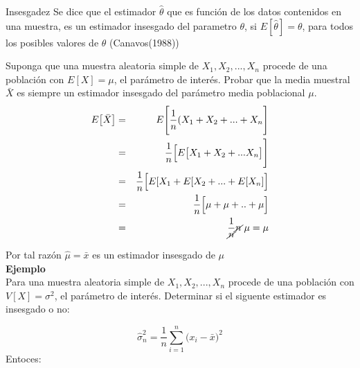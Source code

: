 \documentclass[base=hide,11pt]{elegantbook}
\begin{document}
{\begin{Box2}{Insesgadez} 			
Se dice que el estimador $\widehat{\theta}$ que es función de los datos contenidos en una muestra, es un estimador insesgado del parametro $\theta$, si $E[\widehat{\theta}]=\theta$, para todos los posibles valores de $\theta$ (Canavos(1988)) 
\end{Box2}
			

Suponga que una muestra aleatoria simple de $X_{1},X_{2},...,X_{n}$ procede de una población con $E[X]=\mu$, el parámetro de interés. Probar que la media muestral $\bar{X}$ es siempre un estimador insesgado del parámetro media poblacional $\mu$.\\
\begin{eqnarray*}
E\big[\bar{X}\big]&=&E\Bigg[\frac{1}{n} (X_{1}+X_{2}+...+X_{n}  \Bigg]\\
&=&\frac{1}{n}\Big[E\big[X_{1}+X_{2}+...X_{n}\big]\Bigg]\\
&=& \frac{1}{n}\Big[E[X_{1}+E[X_{2}+...+E[X_{n}] \Big]\\
&=& \frac{1}{n} \Big[\mu+\mu+..+\mu\Big]\\
&=& \frac{1}{\cancel{n}} \cancel{n}\hspace{.1cm}\mu =\mu\\
\end{eqnarray*}

Por tal razón $\widehat{\mu}=\bar{x}$ es un estimador insesgado de $\mu$ \\
			
\textcolor{col3}{\bf \large Ejemplo}\\ 
Para una muestra aleatoria simple de $X_{1},X_{2},...,X_{n}$ procede de una población con $V[X]=\sigma^{2}$, el parámetro de interés. Determinar si el siguente estimador es insesgado o no:
			
$$\widehat{\sigma}^{2}_{n} = \dfrac{1}{n}\sum_{i=1}^{n} \big(x_{i}-\bar{x}\big)^{2}$$
Entoces:
			
}
\end{document}
